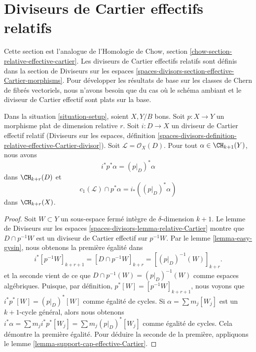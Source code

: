 \section{Diviseurs de Cartier effectifs relatifs}
\label{section-relative-effective-cartier}

\noindent
Cette section est l'analogue de l'Homologie de Chow, section
\ref{chow-section-relative-effective-cartier}. Les diviseurs de Cartier effectifs
relatifs sont définis dans la section de Diviseurs sur les espaces
\ref{spaces-divisors-section-effective-Cartier-morphisms}. Pour développer les
résultats de base sur les classes de Chern de fibrés vectoriels, nous n'avons
besoin que du cas où le schéma ambiant et le diviseur de Cartier effectif sont
plats sur la base.

\begin{lemma}
\label{lemma-relative-effective-cartier}
Dans la situation \ref{situation-setup}, soient $X, Y/B$ bons. Soit $p : X
\to Y$ un morphisme plat de dimension relative $r$. Soit $i : D \to X$ un
diviseur de Cartier effectif relatif (Diviseurs sur les espaces, définition
\ref{spaces-divisors-definition-relative-effective-Cartier-divisor}). Soit
$\mathcal{L} = \mathcal{O}_X(D)$. Pour tout $\alpha \in \CH_{k + 1}(Y)$, nous
avons
$$
i^*p^*\alpha = (p|_D)^*\alpha
$$
dans $\CH_{k + r}(D)$ et
$$
c_1(\mathcal{L}) \cap p^*\alpha = i_* ((p|_D)^*\alpha)
$$
dans $\CH_{k + r}(X)$.
\end{lemma}

\begin{proof}
Soit $W \subset Y$ un sous-espace fermé intègre de $\delta$-dimension $k +
1$. Le lemme de Diviseurs sur les espaces
\ref{spaces-divisors-lemma-relative-Cartier} montre que $D \cap p^{-1}W$
est un diviseur de Cartier effectif sur $p^{-1}W$. Par le lemme
\ref{lemma-easy-gysin}, nous obtenons la première égalité dans
$$
i^*[p^{-1}W]_{k + r + 1} =
[D \cap p^{-1}W]_{k + r} =
[(p|_D)^{-1}(W)]_{k + r}.
$$
et la seconde vient de ce que $D \cap p^{-1}(W) = (p|_D)^{-1}(W)$ comme espaces
algébriques. Puisque, par définition, $p^*[W] = [p^{-1}W]_{k + r + 1}$, nous
voyons que $i^*p^*[W] = (p|_D)^*[W]$ comme égalité de cycles. Si $\alpha = \sum
m_j[W_j]$ est un $k + 1$-cycle général, alors nous obtenons $i^*\alpha = \sum
m_j i^*p^*[W_j] = \sum m_j(p|_D)^*[W_j]$ comme égalité de cycles. Cela démontre
la première égalité. Pour déduire la seconde de la première, appliquons le lemme
\ref{lemma-support-cap-effective-Cartier}.
\end{proof}












